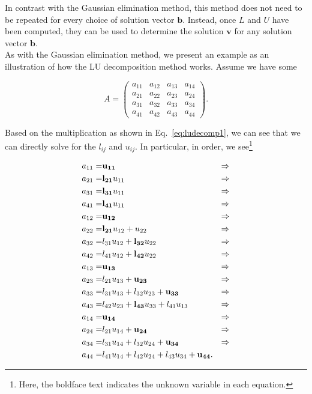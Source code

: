 \documentclass[12pt]{article}
\numberwithin{equation}{section}
\begin{document}
\noindent In contrast with the Gaussian elimination method, this method does not need to be repeated for every choice of solution vector $\textbf{b}$.  Instead, once $L$ and $U$ have been computed, they can be used to determine the solution $\textbf{v}$ for any solution vector $\textbf{b}$.
\\\indent As with the Gaussian elimination method, we present an example as an illustration of how the LU decomposition method works.  Assume we have some 

\begin{equation}
\label{eq:ainit2}
A = \left(\begin{array}{cccc}
a_{11} & a_{12} & a_{13} & a_{14} \\
a_{21} & a_{22} & a_{23} & a_{24} \\
a_{31} & a_{32} & a_{33} & a_{34} \\
a_{41} & a_{42} & a_{43} & a_{44}
\end{array}\right).
\end{equation}

\noindent Based on the multiplication as shown in Eq.~\ref{eq:ludecomp1}, we can see that we can directly solve for the $l_{ij}$ and $u_{ij}$.  In particular, in order, we see\footnote{Here, the boldface text indicates the unknown variable in each equation.}

\begin{equation}
\begin{align}
a_{11} =& {\bf u_{11}} &\Rightarrow \\
a_{21} =& {\bf l_{21}} u_{11} &\Rightarrow \\
a_{31} =& {\bf l_{31}}u_{11} &\Rightarrow \\
a_{41} =& {\bf l_{41}}u_{11} &\Rightarrow \\
a_{12} =& {\bf u_{12}} &\Rightarrow \\
a_{22} =& {\bf l_{21}}u_{12}+u_{22} &\Rightarrow \\
a_{32} =& l_{31}u_{12}+{\bf l_{32}}u_{22} &\Rightarrow \\
a_{42} =& l_{41}u_{12}+{\bf l_{42}}u_{22} &\Rightarrow \\
a_{13} =& {\bf u_{13}} &\Rightarrow \\
a_{23} =& l_{21}u_{13}+{\bf u_{23}} &\Rightarrow \\
a_{33} =& l_{31}u_{13}+l_{32}u_{23}+{\bf u_{33}} &\Rightarrow \\
a_{43} =& l_{42}u_{23}+{\bf l_{43}}u_{33}+l_{41}u_{13} &\Rightarrow \\
a_{14} =& {\bf u_{14}} &\Rightarrow \\
a_{24} =& l_{21}u_{14}+{\bf u_{24}} &\Rightarrow \\
a_{34} =& l_{31}u_{14}+l_{32}u_{24}+{\bf u_{34}} &\Rightarrow \\
a_{44} =& l_{41}u_{14}+l_{42}u_{24}+l_{43}u_{34}+{\bf u_{44}}. &
\end{align}
\end{equation}
\end{document}
